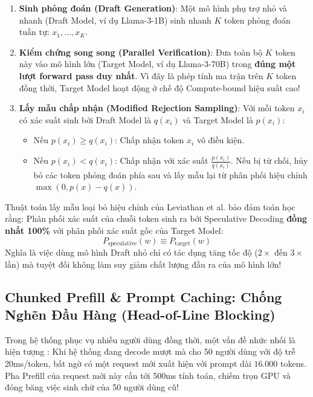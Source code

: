 \begin{enumerate}
  \item \textbf{Sinh phỏng đoán (Draft Generation)}: Một mô hình phụ trợ nhỏ và nhanh (Draft Model, ví dụ Llama-3-1B) sinh nhanh $K$ token phỏng đoán tuần tự: $x_1, \dots, x_K$.
  \item \textbf{Kiểm chứng song song (Parallel Verification)}: Đưa toàn bộ $K$ token này vào mô hình lớn (Target Model, ví dụ Llama-3-70B) trong \textbf{đúng một lượt forward pass duy nhất}. Vì đây là phép tính ma trận trên $K$ token đồng thời, Target Model hoạt động ở chế độ Compute-bound hiệu suất cao!
  \item \textbf{Lấy mẫu chấp nhận (Modified Rejection Sampling)}:
  Với mỗi token $x_i$ có xác suất sinh bởi Draft Model là $q(x_i)$ và Target Model là $p(x_i)$:
  \begin{itemize}
    \item Nếu $p(x_i) \ge q(x_i)$: Chấp nhận token $x_i$ vô điều kiện.
    \item Nếu $p(x_i) < q(x_i)$: Chấp nhận với xác suất $\frac{p(x_i)}{q(x_i)}$. Nếu bị từ chối, hủy bỏ các token phỏng đoán phía sau và lấy mẫu lại từ phân phối hiệu chỉnh $\max(0, p(x) - q(x))$.
  \end{itemize}
\end{enumerate}

\begin{theorem}
Thuật toán lấy mẫu loại bỏ hiệu chỉnh của Leviathan et al. bảo đảm toán học rằng: Phân phối xác suất của chuỗi token sinh ra bởi Speculative Decoding \textbf{đồng nhất 100\%} với phân phối xác suất gốc của Target Model:
\begin{equation}
P_{\text{speculative}}(w) \equiv P_{\text{target}}(w)
\end{equation}
Nghĩa là việc dùng mô hình Draft nhỏ chỉ có tác dụng tăng tốc độ ($2\times$ đến $3\times$ lần) mà tuyệt đối không làm suy giảm chất lượng đầu ra của mô hình lớn!
\end{theorem}

\subsection{Chunked Prefill \& Prompt Caching: Chống Nghẽn Đầu Hàng (Head-of-Line Blocking)}
Trong hệ thống phục vụ nhiều người dùng đồng thời, một vấn đề nhức nhối là hiện tượng :
Khi hệ thống đang decode mượt mà cho 50 người dùng với độ trễ 20ms/token, bất ngờ có một request mới xuất hiện với prompt dài $16.000$ tokens. Pha Prefill của request mới này cần tới 500ms tính toán, chiếm trọn GPU và đóng băng việc sinh chữ của 50 người dùng cũ!

